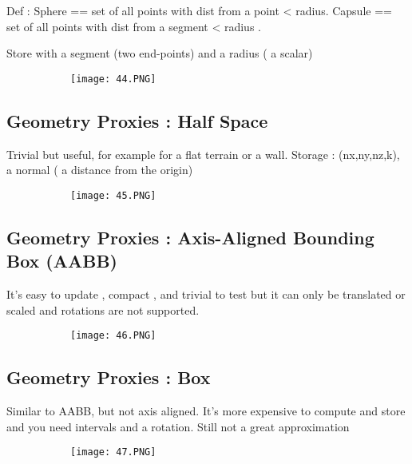 \documentclass{article}
\begin{document}
Def : Sphere == set of all points with dist from a point < radius. Capsule == set of all points with dist from a segment < radius .

Store with a segment (two end-points) and a radius ( a scalar)

\begin{figure}[ht!]
  \centering
  \begin{subfigure}[b]{0.2\linewidth}
    \texttt{[image: 44.PNG]}
  \end{subfigure}
\end{figure}

\subsection{Geometry Proxies : Half Space}
Trivial but useful, for example for a flat terrain or a wall.
Storage : (nx,ny,nz,k), a normal ( a distance from the origin)

\begin{figure}[ht!]
  \centering
  \begin{subfigure}[b]{0.05\linewidth}
    \texttt{[image: 45.PNG]}
  \end{subfigure}
\end{figure}

\subsection{Geometry Proxies : Axis-Aligned Bounding Box (AABB)}

It's easy to update  , compact , and trivial to test but it can only be translated or scaled and rotations are not supported.

\begin{figure}[ht!]
  \centering
  \begin{subfigure}[b]{0.2\linewidth}
    \texttt{[image: 46.PNG]}
  \end{subfigure}
\end{figure}

\subsection{Geometry Proxies : Box}
Similar to AABB, but not axis aligned. It's more expensive to compute and store and you need intervals and a rotation. Still not a great approximation

\begin{figure}[ht!]
  \centering
  \begin{subfigure}[b]{0.2\linewidth}
    \texttt{[image: 47.PNG]}
  \end{subfigure}
\end{figure}
\end{document}
